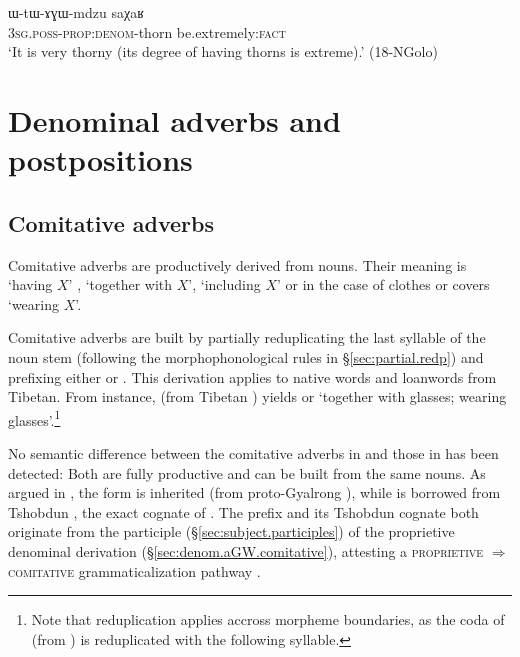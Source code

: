\begin{exe}
\ex \label{ex:WtAGWmdzu}
\gll ɯ-tɯ-ɤɣɯ-mdzu saχaʁ \\
\textsc{3sg}.\textsc{poss}-\textsc{prop}:\textsc{denom}-thorn be.extremely:\textsc{fact} \\
\glt `It is very thorny (its degree of having thorns is extreme).' (18-NGolo) 
\end{exe}

 
\section{Denominal adverbs and postpositions} \label{sec:denominal.adverb}

\subsection{Comitative adverbs} \label{sec:comitative.adverb}
Comitative adverbs are productively derived from nouns. Their meaning is `having $X$' , `together with $X$', `including $X$' or in the case of clothes or covers `wearing $X$'.

Comitative adverbs are built by partially reduplicating the last syllable of the noun stem (following the morphophonological rules in §\ref{sec:partial.redp}) and prefixing either  or . This derivation applies to native words and loanwords from Tibetan. From instance,  (from Tibetan ) yields  or  `together with glasses; wearing glasses'.\footnote{Note that reduplication applies accross morpheme boundaries, as the coda of  (from ) is reduplicated with the following syllable. } 

No semantic difference between the comitative adverbs in  and those in  has been detected: Both are fully productive and can be built from the same nouns. As argued in \citet{jacques17comitative}, the  form is inherited (from proto-Gyalrong ), while  is borrowed from Tshobdun , the exact cognate of  \citep[107]{jackson98morphology}. The prefix  and its Tshobdun cognate  both originate from the participle  (§\ref{sec:subject.participles}) of the proprietive  denominal derivation (§\ref{sec:denom.aGW.comitative}), attesting a \textsc{proprietive} $\Rightarrow$ \textsc{comitative} grammaticalization pathway \citep{jacques17comitative}. 

